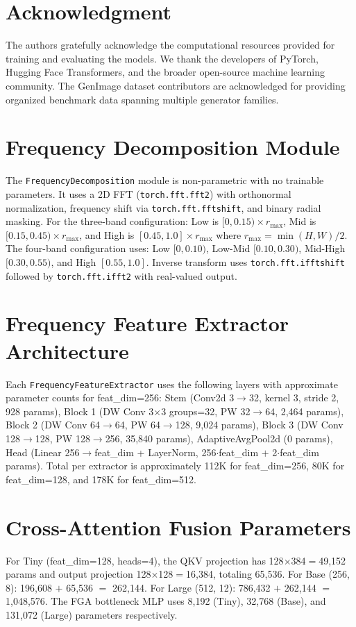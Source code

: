 \documentclass[journal]{IEEEtran}
\begin{document}
\section*{Acknowledgment}
The authors gratefully acknowledge the computational resources provided for training and evaluating the models. We thank the developers of PyTorch, Hugging Face Transformers, and the broader open-source machine learning community. The GenImage dataset contributors are acknowledged for providing organized benchmark data spanning multiple generator families.

\appendices
\section{Frequency Decomposition Module}
\label{app:decomp}
The \texttt{FrequencyDecomposition} module is non-parametric with no trainable parameters. It uses a 2D FFT (\texttt{torch.fft.fft2}) with orthonormal normalization, frequency shift via \texttt{torch.fft.fftshift}, and binary radial masking. For the three-band configuration: Low is $[0, 0.15) \times r_{\max}$, Mid is $[0.15, 0.45) \times r_{\max}$, and High is $[0.45, 1.0] \times r_{\max}$ where $r_{\max} = \min(H,W)/2$. The four-band configuration uses: Low $[0, 0.10)$, Low-Mid $[0.10, 0.30)$, Mid-High $[0.30, 0.55)$, and High $[0.55, 1.0]$. Inverse transform uses \texttt{torch.fft.ifftshift} followed by \texttt{torch.fft.ifft2} with real-valued output.

\section{Frequency Feature Extractor Architecture}
\label{app:extractor}
Each \texttt{FrequencyFeatureExtractor} uses the following layers with approximate parameter counts for feat\_dim=256: Stem (Conv2d 3$\rightarrow$32, kernel 3, stride 2, 928 params), Block 1 (DW Conv 3$\times$3 groups=32, PW 32$\rightarrow$64, 2,464 params), Block 2 (DW Conv 64$\rightarrow$64, PW 64$\rightarrow$128, 9,024 params), Block 3 (DW Conv 128$\rightarrow$128, PW 128$\rightarrow$256, 35,840 params), AdaptiveAvgPool2d (0 params), Head (Linear 256$\rightarrow$feat\_dim + LayerNorm, 256$\cdot$feat\_dim $+$ 2$\cdot$feat\_dim params). Total per extractor is approximately 112K for feat\_dim=256, 80K for feat\_dim=128, and 178K for feat\_dim=512.

\section{Cross-Attention Fusion Parameters}
\label{app:attention}
For Tiny (feat\_dim=128, heads=4), the QKV projection has 128$\times$384$=$49,152 params and output projection 128$\times$128$=$16,384, totaling 65,536. For Base (256, 8): 196,608 $+$ 65,536 $=$ 262,144. For Large (512, 12): 786,432 $+$ 262,144 $=$ 1,048,576. The FGA bottleneck MLP uses 8,192 (Tiny), 32,768 (Base), and 131,072 (Large) parameters respectively.
\end{document}
